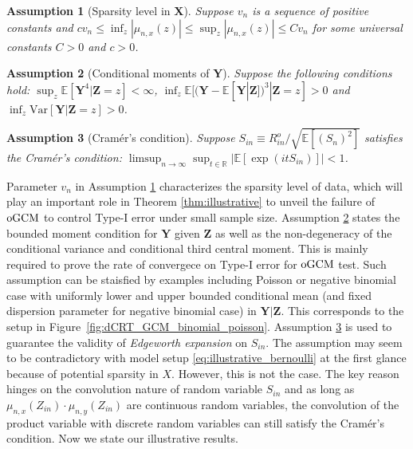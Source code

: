 \documentclass[12pt]{article}
\newtheorem{assumption}{Assumption}
\theoremstyle{definition}
\newcommand{\E}{\mathbb E}								%
\newcommand{\prx}{\bm X}								%
\newcommand{\prz}{\bm Z}								%
\newcommand{\srz}{Z}									%
\newcommand{\pry}{{\bm Y}}								%
\newcommand{\oGCM}{\textnormal{oGCM}}						%
\begin{document}
\begin{assumption}[Sparsity level in $\prx$]\label{assu:sparsity}
  Suppose $v_n$ is a sequence of positive constants and $cv_n\leq\inf_{z}|\mu_{n,x}(z)|\leq \sup_{z}|\mu_{n,x}(z)|\leq Cv_n$ for some universal constants $C>0$ and $c>0$. 
\end{assumption}
\begin{assumption}[Conditional moments of $\pry$]\label{assu:finite-y-on-z-variance}
	Suppose the following conditions hold: $\sup_z\E[\pry^4|\prz=z]<\infty$, $\inf_z\E[(\pry - \E[\pry|\prz])^3|\prz=z]>0$ and $\inf_z\mathrm{Var}[\pry|\prz=z]>0$.
\end{assumption}
\begin{assumption}[Cram\'er's condition]\label{assu:abs-cont}
	Suppose $S_{in}\equiv R_{in}^o/\sqrt{\E[(S_n)^2]}$ satisfies the Cram\'er's condition: $\limsup_{n\rightarrow\infty}\sup_{t\in\mathbb{R}}|\E[\exp(itS_{in})]|<1$.
  \end{assumption}
Parameter $v_n$ in Assumption \ref{assu:sparsity} characterizes the sparsity level of data, which will play an important role in Theorem \ref{thm:illustrative} to unveil the failure of $\oGCM$ to control Type-I error under small sample size.  Assumption \ref{assu:finite-y-on-z-variance} states the bounded moment condition for $\pry$ given $\prz$ as well as the non-degeneracy of the conditional variance and conditional third central moment. This is mainly required to prove the rate of convergece on Type-I error for $\oGCM$ test. Such assumption can be staisfied by examples including Poisson or negative binomial case with uniformly lower and upper bounded conditional mean (and fixed dispersion parameter for negative binomial case) in $\pry|\prz$. This corresponds to the setup in Figure~\ref{fig:dCRT_GCM_binomial_poisson}. Assumption \ref{assu:abs-cont} is used to guarantee the validity of \textit{Edgeworth expansion} on $S_{in}$. The assumption may seem to be contradictory with model setup \eqref{eq:illustrative_bernoulli} at the first glance because of potential sparsity in $X$. However, this is not the case. The key reason hinges on the convolution nature of random variable $S_{in}$ and as long as $\mu_{n,x}(\srz_{in})\cdot \mu_{n,y}(\srz_{in})$ are continuous random variables, the convolution of the product variable with discrete random variables can still satisfy the Cram\'er's condition. Now we state our illustrative results.
\end{document}
